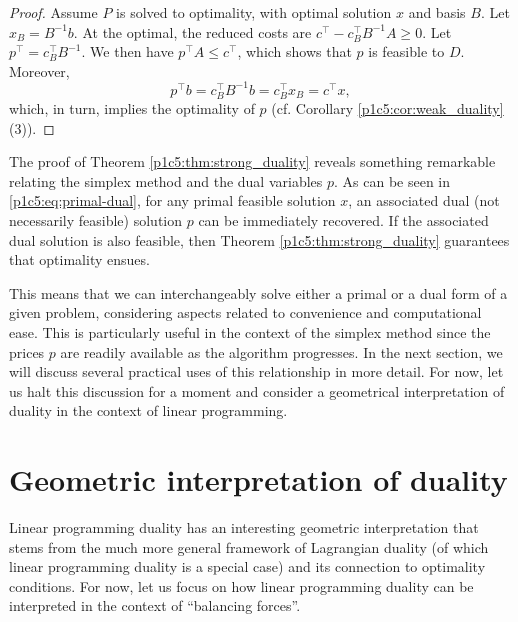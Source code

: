 \begin{proof}
	Assume $P$ is solved to optimality, with optimal solution $x$ and basis $B$. Let $x_B = B^{-1}b$. At the optimal, the reduced costs are $c^\top - c_B^\top B^{-1}A \geq 0$. Let $p^\top = c_B^\top B^{-1}$. We then have $p^\top A \leq c^\top$, which shows that $p$ is feasible to $D$. Moreover,
%
	\begin{equation} \label{p1c5:eq:primal-dual}
		p^\top b = c_B^\top B^{-1}b = c_B^\top x_B = c^\top x,			
	\end{equation}
%
which, in turn, implies the optimality of $p$ (cf. Corollary \ref{p1c5:cor:weak_duality} (3)). \qedhere
\end{proof}

The proof of Theorem \ref{p1c5:thm:strong_duality} reveals something remarkable relating the simplex method and the dual variables $p$. As can be seen in \eqref{p1c5:eq:primal-dual}, for any primal feasible solution $x$, an associated dual (not necessarily feasible) solution $p$ can be immediately recovered. If the associated dual solution is also feasible, then Theorem \ref{p1c5:thm:strong_duality} guarantees that optimality ensues.

This means that we can interchangeably solve either a primal or a dual form of a given problem, considering aspects related to convenience and computational ease. This is particularly useful in the context of the simplex method since the prices $p$ are readily available as the algorithm progresses. In the next section, we will discuss several practical uses of this relationship in more detail. For now, let us halt this discussion for a moment and consider a geometrical interpretation of duality in the context of linear programming.


\section{Geometric interpretation of duality}

Linear programming duality has an interesting geometric interpretation that stems from the much more general framework of Lagrangian duality (of which linear programming duality is a special case) and its connection to optimality conditions. For now, let us focus on how linear programming duality can be interpreted in the context of ``balancing forces''. 

